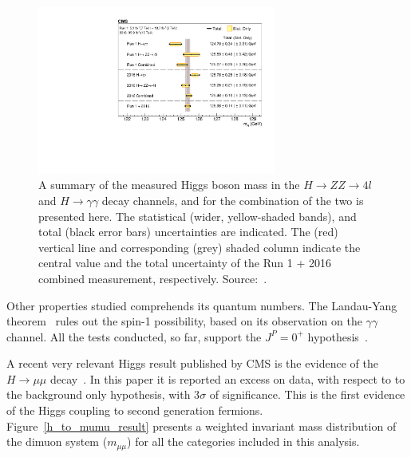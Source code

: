 \begin{figure}[htbp]
  \centering
  \includegraphics[width=0.7\textwidth]{figures_and_tables/theory/cms_higgs_mass.pdf}
  \caption{A summary of the measured Higgs boson mass in the $H \rightarrow ZZ \rightarrow 4l$ and $H \rightarrow \gamma\gamma$ decay channels, and for the combination of the two is presented here. The statistical (wider, yellow-shaded bands), and total (black error bars) uncertainties are indicated. The (red) vertical line and corresponding (grey) shaded column indicate the central value and the total uncertainty of the Run 1 + 2016 combined measurement, respectively. Source:~\cite{Sirunyan:2020xwk}.}
  \label{higgs_mass}
\end{figure}

Other properties studied comprehends its quantum numbers. The Landau-Yang theorem~\cite{Landau:1948kw,Yang:1950rg} rules out the spin-1 possibility, based on its observation on the $\gamma\gamma$ channel. All the tests conducted, so far, support the $J^P = 0^+$ hypothesis~\cite{cms_higgs_spin_tests}.

A recent very relevant Higgs result published by CMS is the evidence of the $H \rightarrow \mu\mu$ decay~\cite{cms_higgs_mumu}. In this paper it is reported an excess on data, with respect to to the background only hypothesis, with 3$\sigma$ of significance. This is the first evidence of the Higgs coupling to second generation fermions. Figure~\ref{h_to_mumu_result} presents a weighted invariant mass distribution of the dimuon system ($m_{\mu\mu}$) for all the categories included in this analysis.


